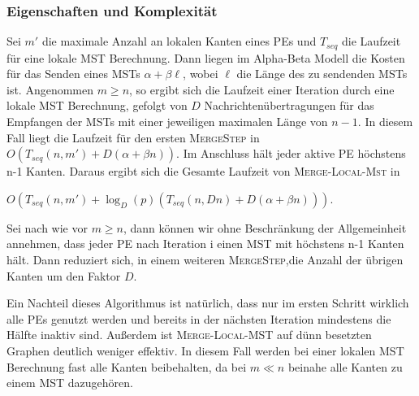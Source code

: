 \subsubsection{Eigenschaften und Komplexität}
Sei $m'$ die maximale Anzahl an lokalen Kanten eines PEs und $T_{seq}$ die Laufzeit für eine lokale MST Berechnung.
Dann liegen im Alpha-Beta Modell die Kosten für das Senden eines MSTs $\alpha + \beta \ell$, wobei $\ell$ die Länge des zu sendenden MSTs ist.  Angenommen $m \geq n$, so ergibt sich die Laufzeit einer Iteration durch eine lokale MST Berechnung, gefolgt von $D$ Nachrichtenübertragungen für das Empfangen der MSTs mit einer jeweiligen maximalen Länge von $n-1$. In diesem Fall liegt die Laufzeit für den ersten \textsc{MergeStep} in  $O(T_{seq}(n,m') + D(\alpha +\beta n))$. 
Im Anschluss hält jeder aktive PE höchstens n-1 Kanten. Daraus ergibt sich die Gesamte Laufzeit von \textsc{Merge-Local-Mst} in 
\begin{center}
    $O(T_{seq}(n,m') +
    \log_{D}(p) (T_{seq}(n,Dn) + D(\alpha +\beta n)))$.
\end{center}

Sei nach wie vor $m \geq n$, dann können wir ohne Beschränkung der Allgemeinheit annehmen, dass jeder PE nach Iteration i einen MST mit höchstens n-1 Kanten hält. Dann reduziert sich, in einem weiteren  \textsc{MergeStep},die Anzahl der übrigen Kanten um den Faktor $D$.

Ein Nachteil dieses Algorithmus ist natürlich, dass nur im ersten Schritt wirklich alle PEs genutzt werden und bereits in der nächsten Iteration mindestens die Hälfte inaktiv sind.
Außerdem ist \textsc{Merge-Local-MST} auf dünn besetzten Graphen deutlich weniger effektiv. In diesem Fall werden bei einer lokalen MST Berechnung fast alle Kanten beibehalten, da bei $m \ll n$ beinahe alle Kanten zu einem MST dazugehören.

